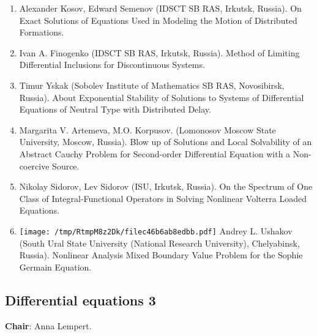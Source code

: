 \documentclass[
]{article}
\providecommand{\tightlist}{%
  \setlength{\itemsep}{0pt}\setlength{\parskip}{0pt}}
\begin{document}
\begin{enumerate}
\def\labelenumi{\arabic{enumi}.}
\tightlist
\item
  Alexander Kosov, Edward Semenov (IDSCT SB RAS, Irkutsk, Russia). On
  Exact Solutions of Equations Used in Modeling the Motion of
  Distributed Formations.
\item
  Ivan A. Finogenko (IDSCT SB RAS, Irkutsk, Russia). Method of Limiting
  Differential Inclusions for Discontinuous Systems.
\item
  Timur Yskak (Sobolev Institute of Mathematics SB RAS, Novosibirsk,
  Russia). About Exponential Stability of Solutions to Systems of
  Differential Equations of Neutral Type with Distributed Delay.
\item
  Margarita V. Artemeva, M.O. Korpusov. (Lomonosov Moscow State
  University, Moscow, Russia). Blow up of Solutions and Local
  Solvability of an Abstract Cauchy Problem for Second-order
  Differential Equation with a Non-coercive Source.
\item
  Nikolay Sidorov, Lev Sidorov (ISU, Irkutsk, Russia). On the Spectrum
  of One Class of Integral-Functional Operators in Solving Nonlinear
  Volterra Loaded Equations.
\item
  \protect\texttt{[image: /tmp/RtmpM8z2Dk/filec46b6ab8edbb.pdf]}
  Andrey L. Ushakov (South Ural State University (National Research
  University), Chelyabinsk, Russia). Nonlinear Analysis Mixed Boundary
  Value Problem for the Sophie Germain Equation.
\end{enumerate}

\hypertarget{de3}{%
\subsection{Differential equations 3}\label{de3}}

\textbf{Chair}: Anna Lempert.
\end{document}
